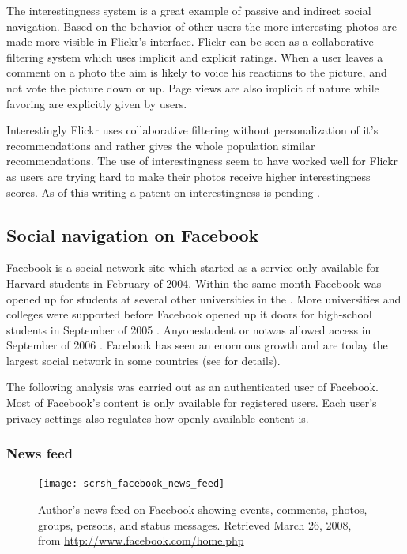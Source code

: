The interestingness system is a great example of passive and indirect social
navigation. Based on the behavior of other users the more interesting photos
are made more visible in Flickr's interface. Flickr can be seen as a
collaborative filtering system which uses implicit and explicit ratings.
When a user leaves a comment on a photo the aim is likely to voice his
reactions to the picture, and not vote the picture down or up. Page views
are also implicit of nature while favoring are explicitly given by users.

Interestingly Flickr uses
collaborative filtering without personalization of it's recommendations and
rather gives the whole population similar recommendations.
The use of interestingness seem
to have worked well for Flickr as users are trying hard to make their photos
receive higher interestingness scores.
As of this writing a patent on interestingness is pending
\citep{butterfield06b}.

\subsection{Social navigation on Facebook}
\label{section:analysis.facebook}

Facebook is a social network site which started as a service only available
for Harvard students in February of 2004. Within the same month Facebook was
opened up for students at several other universities in the . More
universities and colleges were supported before Facebook opened up it
doors for high-school students in September of 2005 \citep{cassidy06}.
Anyone\dash{}student or not\dash{}was allowed access in
September of 2006 \citep{abram06}.
Facebook has seen an enormous growth and are today the largest social network
in some countries (see
for details).

The following analysis was carried out as an authenticated user of Facebook.
Most of Facebook's content is only available for registered users. Each user's
privacy settings also regulates how openly available content is.

\subsubsection{News feed}
\label{section:analysis.facebook.news.feed}

\begin{figure}
  \texttt{[image: scrsh\_facebook\_news\_feed]}
  \caption[Facebook News Feed]{%
     Author's news feed on Facebook showing events, comments,
     photos, groups, persons, and status messages.
     Retrieved March 26, 2008, from \url{http://www.facebook.com/home.php}}
  \label{figure:scrsh.facebook.news.feed}
\end{figure}

